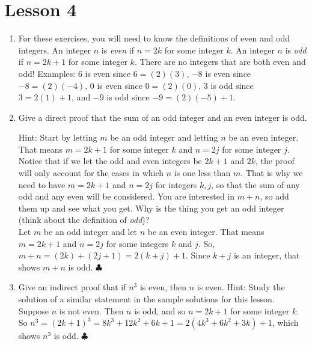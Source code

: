 \documentclass[11pt]{amsart}
\begin{document}
\section{Lesson 4}

\begin{enumerate}

\item [] For  these exercises, you will need to know the definitions of even and odd integers. 
 An integer $n$ is {\it even} if $n=2k$ for some integer $k$. An integer $n$ is {\it odd}
if $n=2k+1$ for some integer $k$. There are no integers that are both even and odd!
Examples: $6$ is even since $6 = (2)(3)$, $-8$ is even since $-8 = (2)(-4)$, $0$ is even since $0 = (2)(0)$, $3$ is odd since $3 = 2(1)+1$, and $-9$ is odd since $-9 = (2)(-5)+1$.\\[8pt]


\item Give a direct proof that the sum of  an odd integer and an even integer is odd. 

Hint: Start by letting $m$ be an odd integer and letting $n$ be an even integer. That means $m = 2k+1$ for some integer $k$ and $n = 2j$ for some integer $j$. Notice that if we let the odd and even integers be $2k+1$ and $2k$, the proof will only account for the cases in which $n$ is one less than $m$.
That is why we need to have $m = 2k+1$ and $n=2j$ for integers $k,j$, so that the sum of  any odd and any even will be considered. 
You are interested in $m+ n$, so add them up and see what you get.  Why is the thing you get an odd integer (think about the definition of {\it odd})?\\[5pt]

{\color{blue}
Let $m$ be an odd integer and let $n$ be an even integer. That means $m = 2k+1$ and $n=2j$ for some integers $k$ and $j$. So, $m+n = (2k)+(2j+1)
= 2(k+j) + 1$. Since $k+j$ is an integer, that shows $m+n$ is odd.  $\clubsuit$}\\[5pt]

\item Give an  indirect proof that if $n^3$ is even, then $n$ is even. Hint: Study the solution of a similar statement in the sample solutions for this lesson.\\[5pt]

{\color{blue} Suppose $n$ is not even. Then $n$ is odd, and so $n = 2k+1$ for some integer $k$. So
$n^{3} = (2k+1)^{3} = 8k^{3} + 12k^{2} + 6k + 1 = 2(4k^{3}+6k^{2}+3k) +1$, which shows $n^{3}$ is odd. $\clubsuit$\\[5pt]
}



\end{enumerate}
\end{document}
